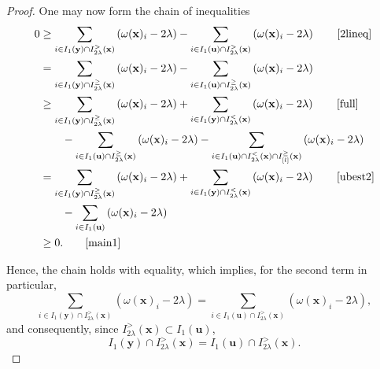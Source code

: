 \documentclass[11pt,a4paper]{article}
\newcommand{\eqjust}[1]{\qquad\eqref{#1}}
\theoremstyle{plain}
\theoremstyle{definition}
\theoremstyle{remark}
\newcommand*\x{\mathbf{x}}
\newcommand*\U{\mathbf{u}}
\newcommand*\y{\mathbf{y}}
\begin{document}
\begin{proof}
  One may now form the chain of inequalities
  \begin{equation}\label{lastchain}
    \begin{aligned}
      0 & \geq \sum_{i \in I_1(\y)\cap I_{2 \lambda}^>(\x)}\left(\omega(\x)_i-2 \lambda\right)-\sum_{i \in I_1(\U)\cap I_{2 \lambda}^>(\x)}\left(\omega(\x)_i-2 \lambda\right)
      \eqjust{2lineq}                                                                                                                                                                                    \\
        & =\sum_{i \in I_1(\y)\cap I_{2 \lambda}^\geq(\x)}\left(\omega(\x)_i-2 \lambda\right)-\sum_{i \in I_1(\U)\cap I_{2 \lambda}^\geq(\x)}\left(\omega(\x)_i-2 \lambda\right)                         \\
        & \geq \sum_{i \in I_1(\y)\cap I_{2 \lambda}^\geq(\x)}\left(\omega(\x)_i-2 \lambda\right)+\sum_{i \in I_1(\y) \cap I^<_{2 \lambda}(\x)}\left(\omega(\x)_i-2 \lambda\right)
      \eqjust{full}                                                                                                                                                                                      \\
        & \qquad-\sum_{i \in I_1(\U)\cap I_{2 \lambda}^\geq(\x)}\left(\omega(\x)_i-2 \lambda\right)- \sum_{i \in I_1(\U)\cap I_{2\lambda}^<(\x)\cap I_{[l]}^\geq(\x)}\left(\omega(\x)_i-2 \lambda\right) \\
        & =\sum_{i \in I_1(\y)\cap I_{2 \lambda}^\geq(\x)}\left(\omega(\x)_i-2 \lambda\right)+\sum_{i \in I_1(\y) \cap I^<_{2 \lambda}(\x)}\left(\omega(\x)_i-2 \lambda\right)
      \eqjust{ubest2}                                                                                                                                                                                    \\
        & \qquad-\sum_{i \in I_1(\U)}\left(\omega(\x)_i-2 \lambda\right)                                                                                                                                 \\
        & \geq 0. \eqjust{main1}
    \end{aligned}
  \end{equation}

  Hence, the chain holds with equality, which implies, for the second term in
  particular,
  \begin{equation}
    \label{greatereq}
    \sum_{i \in I_1(\y)\cap I_{2 \lambda}^>(\x)}\left(\omega(\x)_i-2 \lambda\right)=\sum_{i \in I_1(\U)\cap I_{2 \lambda}^>(\x)}\left(\omega(\x)_i-2 \lambda\right),
  \end{equation}
  and consequently, since \(I_{2\lambda}^>(\x)\subset I_1(\U)\),
  \begin{equation}\label{greatereq2}
    I_1(\y)\cap I_{2 \lambda}^>(\x)=I_1(\U)\cap I_{2 \lambda}^>(\x).
  \end{equation}


\end{proof}
\end{document}
